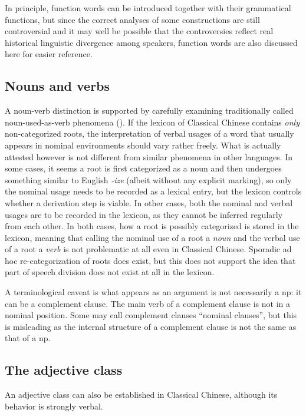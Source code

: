 \documentclass[UTF8, a4paper, oneside, scheme=plain, 12pt]{ctexrep}
\newcommand*{\term}[1]{\emph{#1}}
\newcommand{\form}[1]{\emph{#1}}
\begin{document}
In principle, function words can be introduced together with their grammatical functions,
but since the correct analyses of some constructions are still controversial
and it may well be possible that the controversies reflect
real historical linguistic divergence among speakers,
function words are also discussed here for easier reference.

\subsection{Nouns and verbs}

A noun-verb distinction is supported by carefully examining traditionally called noun-used-as-verb phenomena
().
If the lexicon of Classical Chinese contains \emph{only} non-categorized roots,
the interpretation of verbal usages of a word that usually appears in nominal environments
should vary rather freely.
What is actually attested however is not different from similar phenomena in other languages.
In some cases, it seems a root is first categorized as a noun 
and then undergoes something similar to English \form{-ize} (albeit without any explicit marking),
so only the nominal usage needs to be recorded as a lexical entry,
but the lexicon controls whether a derivation step is viable.
In other cases, 
both the nominal and verbal usages are to be recorded in the lexicon,
as they cannot be inferred regularly from each other.
In both cases, how a root is possibly categorized is stored in the lexicon,
meaning that calling the nominal use of a root a \term{noun} and the verbal use of a root a \term{verb}
is not problematic at all even in Classical Chinese.
Sporadic ad hoc re-categorization of roots does exist,
but this does not support the idea that part of speech division does not exist at all in the lexicon.

A terminological caveat is what appears as an argument is not necessarily a \ac{np}:
it can be a complement clause.
The main verb of a complement clause is not in a nominal position.
Some may call complement clauses ``nominal clauses'',
but this is misleading as the internal structure of a complement clause is not the same as that of a \ac{np}.

\subsection{The adjective class}

An adjective class can also be established in Classical Chinese,
although its behavior is strongly verbal. 
\end{document}
